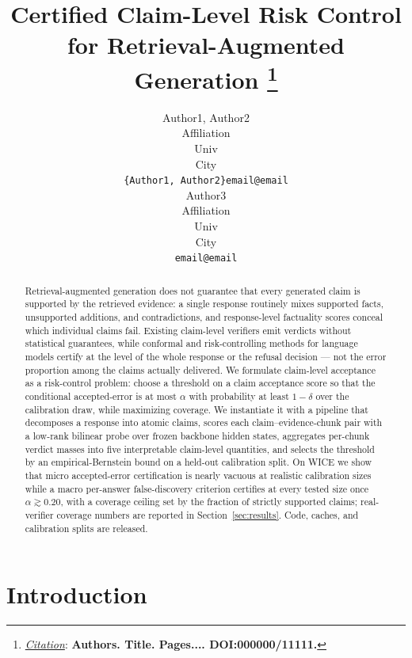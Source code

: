 \documentclass{article}
\title{Certified Claim-Level Risk Control for Retrieval-Augmented Generation
\thanks{\textit{\underline{Citation}}:
\textbf{Authors. Title. Pages.... DOI:000000/11111.}}
}
\author{
  Author1, Author2 \\
  Affiliation \\
  Univ \\
  City\\
  \texttt{\{Author1, Author2\}email@email} \\
  \And
  Author3 \\
  Affiliation \\
  Univ \\
  City\\
  \texttt{email@email} \\
}
\begin{document}
\maketitle

\begin{abstract}
Retrieval-augmented generation does not guarantee that every generated
claim is supported by the retrieved evidence: a single response routinely
mixes supported facts, unsupported additions, and contradictions, and
response-level factuality scores conceal which individual claims fail.
Existing claim-level verifiers emit verdicts without statistical
guarantees, while conformal and risk-controlling methods for language
models certify at the level of the whole response or the refusal
decision --- not the error proportion among the claims actually
delivered. We formulate claim-level acceptance as a risk-control
problem: choose a threshold on a claim acceptance score so that the
conditional accepted-error is at most $\alpha$ with probability at least
$1-\delta$ over the calibration draw, while maximizing coverage. We
instantiate it with a pipeline that decomposes a response into atomic
claims, scores each claim--evidence-chunk pair with a low-rank bilinear
probe over frozen backbone hidden states, aggregates per-chunk verdict
masses into five interpretable claim-level quantities, and selects the
threshold by an empirical-Bernstein bound on a held-out calibration
split. On WICE we show that micro accepted-error certification is nearly
vacuous at realistic calibration sizes while a macro per-answer
false-discovery criterion certifies at every tested size once
$\alpha\gtrsim0.20$, with a coverage ceiling set by the fraction of
strictly supported claims; real-verifier coverage numbers are reported
in Section~\ref{sec:results}. Code, caches, and calibration splits are
released.
\end{abstract}


\section{Introduction}
\label{sec:intro}
\end{document}
